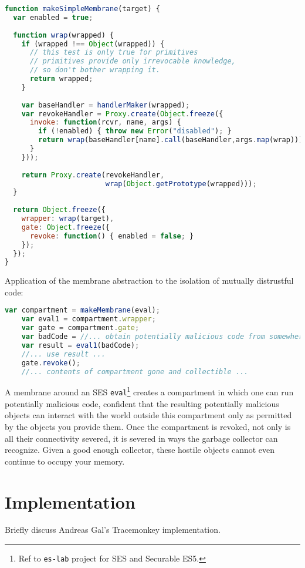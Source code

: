 \documentclass{acm_proc_article-sp}
\begin{document}
\begin{lstlisting}[language=javascript]
function makeSimpleMembrane(target) {
  var enabled = true;
  
  function wrap(wrapped) {
    if (wrapped !== Object(wrapped)) {
      // this test is only true for primitives
      // primitives provide only irrevocable knowledge,
      // so don't bother wrapping it.
      return wrapped;
    }
 
    var baseHandler = handlerMaker(wrapped);
    var revokeHandler = Proxy.create(Object.freeze({
      invoke: function(rcvr, name, args) {
        if (!enabled) { throw new Error("disabled"); }
        return wrap(baseHandler[name].call(baseHandler,args.map(wrap)));
      }
    }));
          
    return Proxy.create(revokeHandler, 
                        wrap(Object.getPrototype(wrapped)));
  }
    
  return Object.freeze({
    wrapper: wrap(target),
    gate: Object.freeze({
      revoke: function() { enabled = false; }
    });
  });
}
\end{lstlisting}

Application of the membrane abstraction to the isolation of mutually distrustful code:

\begin{lstlisting}[language=javascript]
    var compartment = makeMembrane(eval);
    var eval1 = compartment.wrapper;
    var gate = compartment.gate;
    var badCode = //... obtain potentially malicious code from somewhere ...
    var result = eval1(badCode);
    //... use result ...
    gate.revoke();
    //... contents of compartment gone and collectible ...
\end{lstlisting}

A membrane around an SES \texttt{eval}\footnote{Ref to \texttt{es-lab} project for SES and Securable ES5.} creates a compartment in which one can run potentially malicious code, confident that the resulting potentially malicious objects can interact with the world outside this compartment only as permitted by the objects you provide them. Once the compartment is revoked, not only is all their connectivity severed, it is severed in ways the garbage collector can recognize. Given a good enough collector, these hostile objects cannot even continue to occupy your memory.

\section{Implementation}
Briefly discuss Andreas Gal's Tracemonkey implementation.
\end{document}
